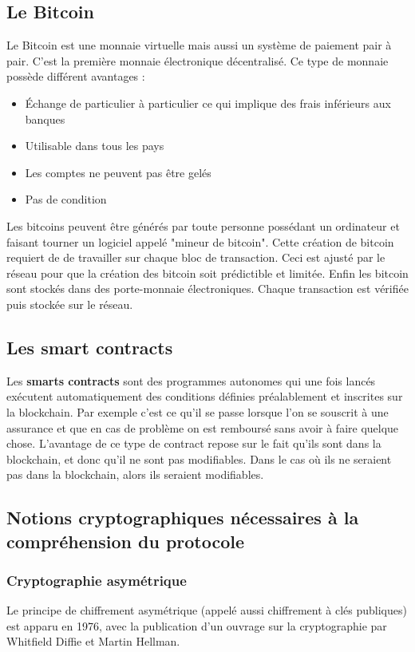 \documentclass[conference]{IEEEtran}
\begin{document}
\newpage

\subsection{Le Bitcoin}

Le Bitcoin est une monnaie virtuelle mais aussi un système de paiement pair à pair. C'est la première monnaie électronique décentralisé. Ce type de monnaie possède différent avantages : 
\begin{itemize}
    \item Échange de particulier à particulier ce qui implique des frais inférieurs aux banques
    \item Utilisable dans tous les pays
    \item Les comptes ne peuvent pas être gelés
    \item Pas de condition
\end{itemize}

Les bitcoins peuvent être générés par toute personne possédant un ordinateur et faisant tourner un logiciel appelé "mineur de bitcoin". Cette création de bitcoin requiert de de travailler sur chaque bloc de transaction. Ceci est ajusté par le réseau pour que la création des bitcoin soit prédictible et limitée. Enfin les bitcoin sont stockés dans des porte-monnaie électroniques. Chaque transaction est vérifiée puis stockée sur le réseau.

\subsection{Les smart contracts}
Les \textbf{smarts contracts} sont des programmes autonomes qui une fois lancés exécutent automatiquement des conditions définies préalablement et inscrites sur la blockchain. Par exemple c'est ce qu'il se passe lorsque l'on se souscrit à une assurance et que en cas de problème on est remboursé sans avoir à faire quelque chose.
L'avantage de ce type de contract repose sur le fait qu'ils sont dans la blockchain, et donc qu'il ne sont pas modifiables. Dans le cas où ils ne seraient pas dans la blockchain, alors ils seraient modifiables.

\subsection{Notions cryptographiques nécessaires à la compréhension du protocole}

\subsubsection{Cryptographie asymétrique}
Le principe de chiffrement asymétrique (appelé aussi chiffrement à clés publiques) est apparu en 1976, avec la publication d'un ouvrage sur la cryptographie par Whitfield Diffie et Martin Hellman. \cite{ccmasym, clepub}
\end{document}
